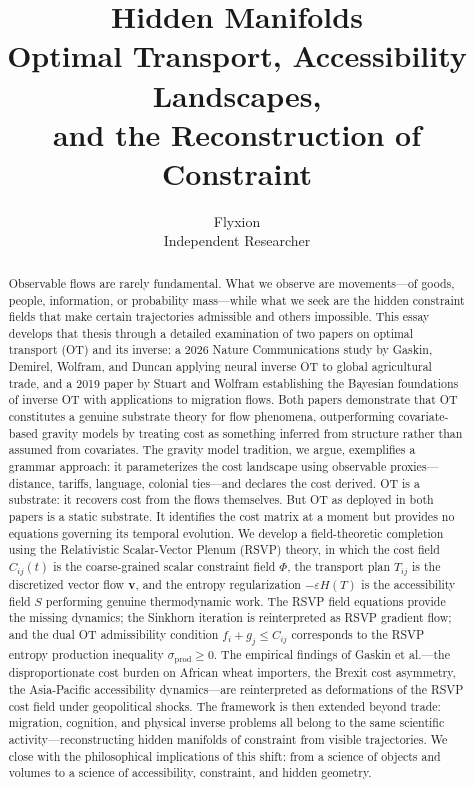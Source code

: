 \documentclass[12pt]{article}
\title{\textbf{Hidden Manifolds}\\[0.5em]
\large Optimal Transport, Accessibility Landscapes,\\
and the Reconstruction of Constraint}
\author{Flyxion\\[0.3em]
\small Independent Researcher}
\date{}
\begin{document}
\maketitle
\thispagestyle{empty}

\begin{abstract}
\noindent
Observable flows are rarely fundamental. What we observe are movements---of goods, people, information, or probability mass---while what we seek are the hidden constraint fields that make certain trajectories admissible and others impossible. This essay develops that thesis through a detailed examination of two papers on optimal transport (OT) and its inverse: a 2026 Nature Communications study by Gaskin, Demirel, Wolfram, and Duncan applying neural inverse OT to global agricultural trade, and a 2019 paper by Stuart and Wolfram establishing the Bayesian foundations of inverse OT with applications to migration flows. Both papers demonstrate that OT constitutes a genuine substrate theory for flow phenomena, outperforming covariate-based gravity models by treating cost as something inferred from structure rather than assumed from covariates. The gravity model tradition, we argue, exemplifies a grammar approach: it parameterizes the cost landscape using observable proxies---distance, tariffs, language, colonial ties---and declares the cost derived. OT is a substrate: it recovers cost from the flows themselves. But OT as deployed in both papers is a static substrate. It identifies the cost matrix at a moment but provides no equations governing its temporal evolution. We develop a field-theoretic completion using the Relativistic Scalar-Vector Plenum (RSVP) theory, in which the cost field $C_{ij}(t)$ is the coarse-grained scalar constraint field $\Phi$, the transport plan $T_{ij}$ is the discretized vector flow $\mathbf{v}$, and the entropy regularization $-\varepsilon H(T)$ is the accessibility field $S$ performing genuine thermodynamic work. The RSVP field equations provide the missing dynamics; the Sinkhorn iteration is reinterpreted as RSVP gradient flow; and the dual OT admissibility condition $f_i + g_j \leq C_{ij}$ corresponds to the RSVP entropy production inequality $\sigma_{\mathrm{prod}} \geq 0$. The empirical findings of Gaskin et al.---the disproportionate cost burden on African wheat importers, the Brexit cost asymmetry, the Asia-Pacific accessibility dynamics---are reinterpreted as deformations of the RSVP cost field under geopolitical shocks. The framework is then extended beyond trade: migration, cognition, and physical inverse problems all belong to the same scientific activity---reconstructing hidden manifolds of constraint from visible trajectories. We close with the philosophical implications of this shift: from a science of objects and volumes to a science of accessibility, constraint, and hidden geometry.
\end{abstract}
\end{document}
